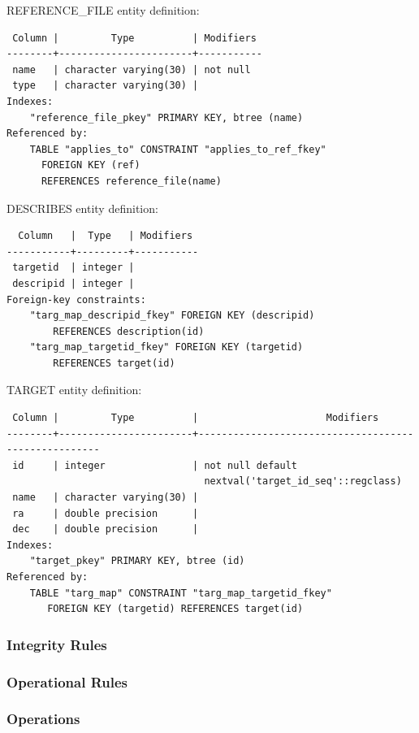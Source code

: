 \documentclass[a4paper,11pt]{article}
\begin{document}
\hrulefill


REFERENCE\_FILE entity definition:
\begin{verbatim}
 Column |         Type          | Modifiers 
--------+-----------------------+-----------
 name   | character varying(30) | not null
 type   | character varying(30) | 
Indexes:
    "reference_file_pkey" PRIMARY KEY, btree (name)
Referenced by:
    TABLE "applies_to" CONSTRAINT "applies_to_ref_fkey" 
      FOREIGN KEY (ref) 
      REFERENCES reference_file(name)

\end{verbatim}

\hrulefill

DESCRIBES entity definition:
\begin{verbatim}
  Column   |  Type   | Modifiers 
-----------+---------+-----------
 targetid  | integer | 
 descripid | integer | 
Foreign-key constraints:
    "targ_map_descripid_fkey" FOREIGN KEY (descripid) 
        REFERENCES description(id)
    "targ_map_targetid_fkey" FOREIGN KEY (targetid) 
        REFERENCES target(id)
\end{verbatim}

\hrulefill

TARGET entity definition:
\begin{verbatim}
 Column |         Type          |                      Modifiers                      
--------+-----------------------+-----------------------------------------------------
 id     | integer               | not null default 
                                  nextval('target_id_seq'::regclass)
 name   | character varying(30) | 
 ra     | double precision      | 
 dec    | double precision      | 
Indexes:
    "target_pkey" PRIMARY KEY, btree (id)
Referenced by:
    TABLE "targ_map" CONSTRAINT "targ_map_targetid_fkey"
       FOREIGN KEY (targetid) REFERENCES target(id)
\end{verbatim}

\hrulefill

\subsubsection{Integrity Rules}
\subsubsection{Operational Rules}
\subsubsection{Operations}
\end{document}
